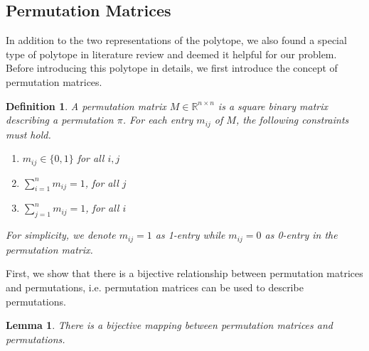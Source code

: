 \documentclass[12pt,letterpaper]{article}
\newcommand*{\R}{\mathbb{R}}
\newtheorem{definition}[theorem]{Definition}
\newtheorem{lemma}[theorem]{Lemma}
\begin{document}
\subsection{Permutation Matrices}
In addition to the two representations of the polytope, we also found a special type of polytope 
in literature review and deemed it helpful for our problem. Before introducing this polytope in details, 
we first introduce the concept of permutation matrices.
\begin{definition}
    A permutation matrix $M \in \R^{n \times n}$ is a square binary matrix describing a permutation $\pi$.
    For each entry $m_{ij}$ of $M$, the following constraints must hold.
    \begin{enumerate}
        \item $m_{ij} \in \{0, 1\}$ for all $i, j$
        \item $\sum_{i = 1}^n m_{ij} = 1$, for all $j$
        \item $\sum_{j = 1}^n m_{ij} = 1$, for all $i$
    \end{enumerate}
    For simplicity, we denote $m_{ij} = 1$ as 1-entry while $m_{ij} = 0$ as 0-entry in the permutation matrix.
\end{definition}
First, we show that there is a bijective relationship between permutation matrices and permutations, i.e. permutation matrices 
can be used to describe permutations.
\begin{lemma}
    There is a bijective mapping between permutation matrices and permutations.
\end{lemma}
\end{document}
